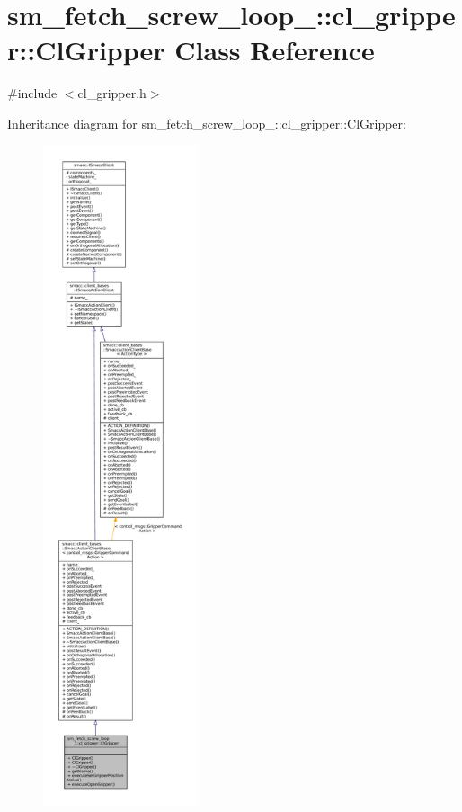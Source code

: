 \hypertarget{classsm__fetch__screw__loop__1_1_1cl__gripper_1_1ClGripper}{}\section{sm\+\_\+fetch\+\_\+screw\+\_\+loop\+\_\+:\+:cl\+\_\+gripper\+:\+:Cl\+Gripper Class Reference}
\label{classsm__fetch__screw__loop__1_1_1cl__gripper_1_1ClGripper}


{\ttfamily \#include $<$cl\+\_\+gripper.\+h$>$}



Inheritance diagram for sm\+\_\+fetch\+\_\+screw\+\_\+loop\+\_\+:\+:cl\+\_\+gripper\+:\+:Cl\+Gripper\+:
\nopagebreak
\begin{figure}[H]
\begin{center}
\leavevmode
\includegraphics[height=550pt]{classsm__fetch__screw__loop__1_1_1cl__gripper_1_1ClGripper__inherit__graph}
\end{center}
\end{figure}


